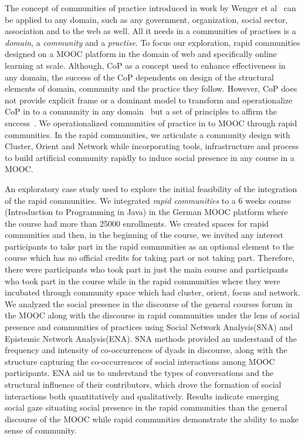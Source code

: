 \documentclass[manuscript,screen,review]{acmart}
\begin{document}
The concept of communities of practice introduced in work by Wenger et al~\cite{wenger1999communities} can be applied to any domain, such as any government, organization, social sector, association and to the web as well. All it needs in a communities of practises is a \textit{domain}, a \textit{community} and a \textit{practise}. To focus our exploration, rapid communities designed on a MOOC platform in the domain of web and specifically online learning at scale. Although, CoP as a concept used to enhance effectiveness in any domain, the success of the CoP dependents on design of the structural elements of domain, community and the practice they follow. However, CoP does not provide explicit frame or a dominant model to transform and operationalize CoP in to a community in any domain~\cite{li2009evolution} but a set of principles to affirm the success~\cite{wenger2002seven}. We operationalized communities of practice in to MOOC through rapid communities. In the rapid communities, we articulate a community design with Cluster, Orient and Network while incorporating tools, infrastructure and process to build artificial community rapidly to induce social presence in any course in a MOOC. 

An exploratory case study used to explore the initial feasibility of the integration of the rapid communities. We integrated \textit{rapid communities} to a 6 weeks course (Introduction to Programming in Java) in the German MOOC platform where the course had more than 25000 enrollments. We created spaces for rapid communities and then, in the beginning of the course, we invited any interest participants to take part in the rapid communities as an optional element to the course which has no official credits for taking part or not taking part. Therefore, there were participants who took part in just the main course and participants who took part in the course while in the rapid communities where they were incubated through community space which had cluster, orient, focus and network. We analyzed the social presence in the discourse of the general courses forum in the MOOC along with the discourse in rapid communities under the lens of social presence and communities of practices using Social Network Analysis(SNA) and Epistemic Network Analysis(ENA). SNA methods provided an understand of the  frequency  and  intensity  of  co-occurrences  of  dyads in discourse, along with the structure capturing the co-occurrences of social interactions among MOOC participants. ENA aid us to understand the types of conversations and the structural influence of their contributors, which drove the formation of social interactions both quantitatively and qualitatively. Results indicate emerging social gaze situating social presence in the rapid communities than the general discourse of the MOOC while rapid communities demonstrate the ability to make sense of community.  
\end{document}
